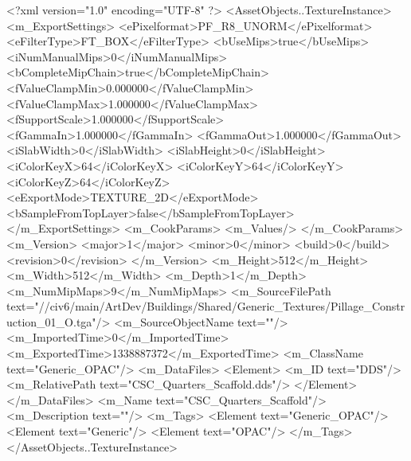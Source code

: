 <?xml version="1.0" encoding="UTF-8" ?>
<AssetObjects..TextureInstance>
	<m_ExportSettings>
		<ePixelformat>PF_R8_UNORM</ePixelformat>
		<eFilterType>FT_BOX</eFilterType>
		<bUseMips>true</bUseMips>
		<iNumManualMips>0</iNumManualMips>
		<bCompleteMipChain>true</bCompleteMipChain>
		<fValueClampMin>0.000000</fValueClampMin>
		<fValueClampMax>1.000000</fValueClampMax>
		<fSupportScale>1.000000</fSupportScale>
		<fGammaIn>1.000000</fGammaIn>
		<fGammaOut>1.000000</fGammaOut>
		<iSlabWidth>0</iSlabWidth>
		<iSlabHeight>0</iSlabHeight>
		<iColorKeyX>64</iColorKeyX>
		<iColorKeyY>64</iColorKeyY>
		<iColorKeyZ>64</iColorKeyZ>
		<eExportMode>TEXTURE_2D</eExportMode>
		<bSampleFromTopLayer>false</bSampleFromTopLayer>
	</m_ExportSettings>
	<m_CookParams>
		<m_Values/>
	</m_CookParams>
	<m_Version>
		<major>1</major>
		<minor>0</minor>
		<build>0</build>
		<revision>0</revision>
	</m_Version>
	<m_Height>512</m_Height>
	<m_Width>512</m_Width>
	<m_Depth>1</m_Depth>
	<m_NumMipMaps>9</m_NumMipMaps>
	<m_SourceFilePath text="//civ6/main/ArtDev/Buildings/Shared/Generic_Textures/Pillage_Construction_01_O.tga"/>
	<m_SourceObjectName text=""/>
	<m_ImportedTime>0</m_ImportedTime>
	<m_ExportedTime>1338887372</m_ExportedTime>
	<m_ClassName text="Generic_OPAC"/>
	<m_DataFiles>
		<Element>
			<m_ID text="DDS"/>
			<m_RelativePath text="CSC_Quarters_Scaffold.dds"/>
		</Element>
	</m_DataFiles>
	<m_Name text="CSC_Quarters_Scaffold"/>
	<m_Description text=""/>
	<m_Tags>
		<Element text="Generic_OPAC"/>
		<Element text="Generic"/>
		<Element text="OPAC"/>
	</m_Tags>
</AssetObjects..TextureInstance>

